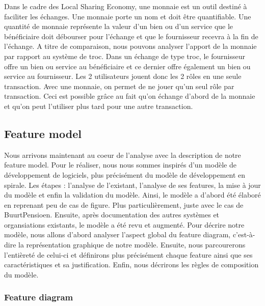 \begin{description}
Dans le cadre des Local Sharing Economy,  une monnaie est un outil destiné à faciliter les échanges.  Une monnaie porte un nom et doit être quantifiable.  Une quantité de monnaie représente la valeur d'un bien ou d'un service que le bénéficiaire doit débourser pour l'échange et que le fournisseur recevra à la fin de l'échange.  A titre de comparaison,  nous pouvons analyser l'apport de la monnaie par rapport au système de troc.  Dans un échange de type troc,  le fournisseur offre un bien ou service au bénéficiaire et ce dernier offre également un bien ou service au fournisseur.  Les 2 utilisateurs jouent donc les 2 rôles en une seule transaction.  Avec une monnaie,  on permet de ne jouer qu'un seul rôle par transaction.  Ceci est possible grâce au fait qu'on échange d'abord de la monnaie et qu'on peut l'utiliser plus tard pour une autre transaction.   

\end{description}

\subsection{Feature model}

Nous arrivons maintenant au coeur de l'analyse avec la description de notre feature model.  Pour le réaliser,  nous nous sommes inspirés d'un modèle de développement de logiciels,  plus précisément du modèle de développement en spirale.  Les étapes : l'analyse de l'existant,  l'analyse de ses features,  la mise à jour du modèle et enfin la validation du modèle.  Ainsi,  le modèle a d'abord été élaboré en reprenant peu de cas de figure.  Plus particulièrement,  juste avec le cas de BuurtPensioen.  Ensuite,  après documentation des autres systèmes et organsiations existants,  le modèle a été revu et augmenté.  
Pour décrire notre modèle,  nous allons d'abord analyser l'aspect global du feature diagram,  c'est-à-dire la représentation graphique de notre modèle.  Ensuite,  nous parcourerons l'entièreté de celui-ci et définirons plus précisément chaque feature ainsi que ses caractéristiques et sa justification.  Enfin,  nous décrirons les règles de composition du modèle.  

\subsubsection{Feature diagram}


